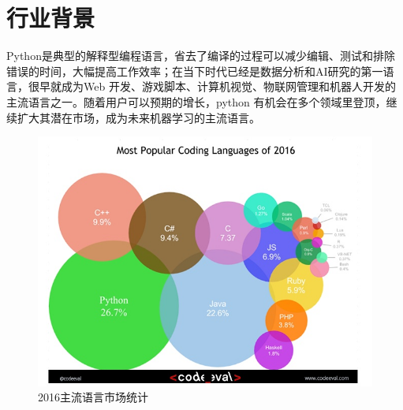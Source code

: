 \documentclass[UTF-8,12pt,a4paper]{ctexart}
\title{\CenterWallPaper{1.1}{fengmian.jpg}}
\date{}
\author{}
\begin{document}
\makeatletter
\renewcommand{\tablename}{表}
\renewcommand{\figurename}{图}
\renewcommand{\thefigure}{\thesection.\arabic{figure}\quad}
\renewcommand{\thetable}{\thesection.\arabic{table}\quad}
\makeatother

\pagestyle{empty}


\newpage

\pagestyle{fancy}
\renewcommand\contentsname{目录}
\tableofcontents

\section{行业背景}
Python是典型的解释型编程语言，省去了编译的过程可以减少编辑、测试和排除错误的时间，大幅提高工作效率；在当下时代已经是数据分析和AI研究的第一语言，很早就成为Web 开发、游戏脚本、计算机视觉、物联网管理和机器人开发的主流语言之一。随着用户可以预期的增长，python 有机会在多个领域里登顶，继续扩大其潜在市场，成为未来机器学习的主流语言。
\begin{figure}[H]
\centering
\includegraphics[width=12cm]{3_pythondatu.jpg}
\caption{2016主流语言市场统计}
\label{2016主流语言市场统计}
\end{figure}
\end{document}
